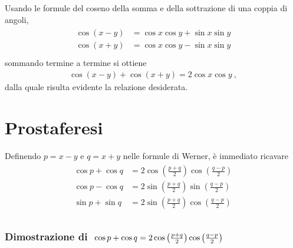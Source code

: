 \documentclass[letterpaper,10pt,italian]{jupyterBook}
\begin{document}
\sphinxAtStartPar
Usando le formule del coseno della somma e della sottrazione di una coppia di angoli,
\begin{equation*}
\begin{split}\begin{aligned}
  \cos( x - y ) & = \cos x \cos y + \sin x \sin y \\
  \cos( x + y ) & = \cos x \cos y - \sin x \sin y \\
\end{aligned}\end{split}
\end{equation*}
\sphinxAtStartPar
sommando termine a termine si ottiene
\begin{equation*}
\begin{split}\cos (x - y) + \cos( x + y ) = 2 \cos x \cos y \ ,\end{split}
\end{equation*}
\sphinxAtStartPar
dalla quale risulta evidente la relazione desiderata.


\section{Prostaferesi}
\label{\detokenize{ch/trigonometry:prostaferesi}}
\sphinxAtStartPar
Definendo \(p = x-y\) e \(q = x+y\) nelle formule di Werner, è immediato ricavare
\begin{equation*}
\begin{split}\begin{aligned}
  \cos p + \cos q & = 2 \cos\left(\frac{p+q}{2} \right) \cos\left(\frac{q-p}{2} \right) \\
  \cos p - \cos q & = 2 \sin\left(\frac{p+q}{2} \right) \sin\left(\frac{q-p}{2} \right) \\
  \sin p + \sin q & = 2 \sin\left(\frac{p+q}{2} \right) \cos\left(\frac{q-p}{2} \right) \\
\end{aligned}\end{split}
\end{equation*}\subsubsection*{Dimostrazione di \protect\(\ \cos p + \cos q = 2 \cos\left(\frac{p+q}{2} \right) \cos\left(\frac{q-p}{2} \right)\protect\)}
\end{document}

